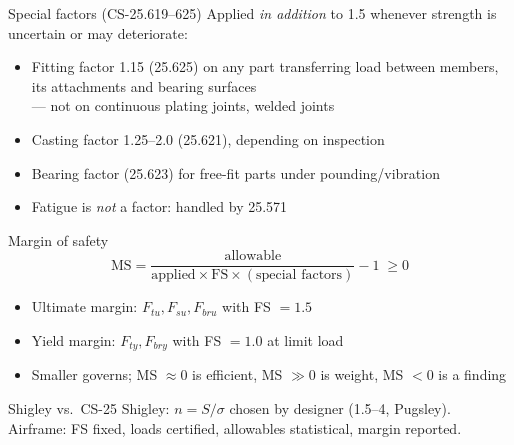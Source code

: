 \documentclass[aspectratio=169,10pt]{beamer}
\begin{document}
\begin{frame}{Special factors (CS-25.619--625)}
Applied \emph{in addition} to 1.5 whenever strength is uncertain or may deteriorate:
\begin{itemize}
  \item \alert{Fitting factor 1.15} (25.625) on any part transferring load between members, its attachments and bearing surfaces\\
        --- not on continuous plating joints, welded joints
  \item Casting factor 1.25--2.0 (25.621), depending on inspection
  \item Bearing factor (25.623) for free-fit parts under pounding/vibration
  \item Fatigue is \emph{not} a factor: handled by 25.571
\end{itemize}
\end{frame}

\begin{frame}{Margin of safety}
\begin{equation*}
  \mathrm{MS}=\frac{\text{allowable}}{\text{applied}\times\mathrm{FS}\times(\text{special factors})}-1\;\ge 0
\end{equation*}
\begin{itemize}
  \item Ultimate margin: $F_{tu},F_{su},F_{bru}$ with FS $=1.5$
  \item Yield margin: $F_{ty},F_{bry}$ with FS $=1.0$ at limit load
  \item Smaller governs; MS $\approx 0$ is efficient, MS $\gg 0$ is weight, MS $<0$ is a finding
\end{itemize}
\begin{block}{Shigley vs.\ CS-25}
Shigley: $n = S/\sigma$ chosen by designer (1.5--4, Pugsley). Airframe: FS fixed, loads certified, allowables statistical, margin reported.
\end{block}
\end{frame}
\end{document}
